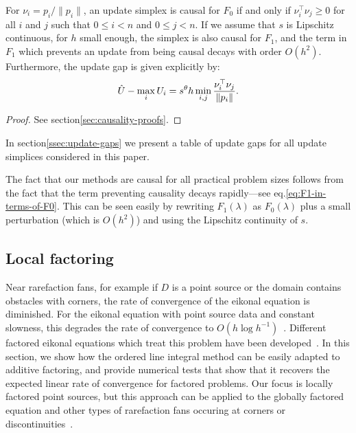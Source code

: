 \documentclass[smallcondensed]{svjour3}
\begin{document}
\begin{theorem}\label{thm:causality}
  For $\nu_i = p_i/\|p_i\|$, an update simplex is causal for $F_0$ if
  and only if $\nu_i^\top \nu_j \geq 0$ for all $i$ and $j$ such that
  $0 \leq i < n$ and $0 \leq j < n$. If we assume that $s$ is
  Lipschitz continuous, for $h$ small enough, the simplex is also
  causal for $F_1$, and the term in $F_1$ which prevents an update
  from being causal decays with order $O(h^2)$. Furthermore, the
  update gap is given explicitly by:
  \begin{equation}
    \hat{U} - \max_i U_i = s^\theta h \min_{i, j} \frac{\nu_i^\top \nu_j}{\left\|p_i\right\|}.
  \end{equation}
\end{theorem}

\begin{proof}
  See section\@ \ref{sec:causality-proofs}.
\end{proof}

In section\@ \ref{ssec:update-gaps} we present a table of update gaps
for all update simplices considered in this paper.

The fact that our methods are causal for all practical problem sizes
follows from the fact that the term preventing causality decays
rapidly---see eq.\@ \ref{eq:F1-in-terms-of-F0}. This can be seen
easily by rewriting $F_1(\lambda)$ as $F_0(\lambda)$ plus a small
perturbation (which is $O(h^2)$) and using the Lipschitz continuity of
$s$.

\subsection{Local factoring}

Near rarefaction fans, for example if $D$ is a point source or the
domain contains obstacles with corners, the rate of convergence of the
eikonal equation is diminished. For the eikonal equation with point
source data and constant slowness, this degrades the rate of
convergence to $O(h \log
h^{-1})$~\cite{qi2018corner,zhao2005fast}. Different factored eikonal
equations which treat this problem have been
developed~\cite{fomel2009fast,luo2012fast}. In this section, we show
how the ordered line integral method can be easily adapted to additive
factoring, and provide numerical tests that show that it recovers the
expected linear rate of convergence for factored problems. Our focus
is locally factored point sources, but this approach can be applied to
the globally factored equation and other types of rarefaction fans
occuring at corners or discontinuities~\cite{qi2018corner}.
\end{document}
